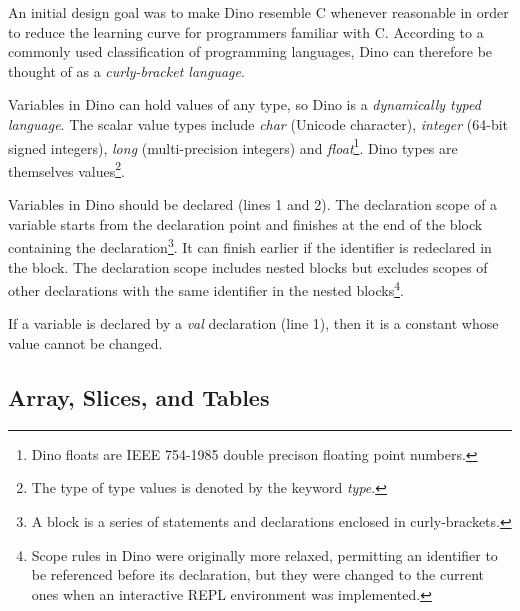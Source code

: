 \documentclass[preprint]{sigplanconf}
\begin{document}
An initial design goal was to make Dino resemble C whenever reasonable
in order to reduce the learning curve for programmers familiar with C.
According to a commonly used classification of programming languages,
Dino can therefore be thought of as a \emph{curly-bracket language}.

Variables in Dino can hold values of any type, so Dino
is a \emph{dynamically typed language}.  The scalar value types
include \emph{char} (Unicode character),
\emph{integer} (64-bit signed integers),
\emph{long} (multi-precision integers) and
\emph{float}\footnote{Dino floats are IEEE 754-1985 double precison
  floating point numbers.}.
Dino types are themselves values\footnote{The type of type values is denoted by the keyword \emph{type}.}.

Variables in Dino should be declared (lines 1 and 2). 
The declaration
scope of a variable starts from the declaration point and finishes at the end of
the block containing the declaration\footnote{A block is a series of statements and declarations enclosed in curly-brackets.}.
It can finish earlier if the identifier is redeclared in the block.
The declaration scope includes nested blocks but excludes scopes of other
declarations with the same identifier in the nested
blocks\footnote{Scope rules in Dino were originally more relaxed,
permitting an identifier to be referenced before its declaration,
 but
they were changed to the current ones when an interactive REPL environment
was implemented.}.

If a variable is declared by a \emph{val} declaration (line 1), then it is a constant
whose value cannot be changed.  

\subsection{Array, Slices, and Tables}
\end{document}

